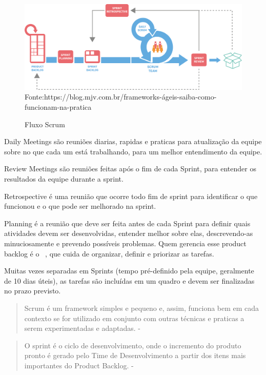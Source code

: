 \begin{figure}[H]
\centering
\caption{Fluxo Scrum} %
\includegraphics[scale=0.2]{Scrum}\\  %
{\small Fonte:https://blog.mjv.com.br/frameworks-ágeis-saiba-como-funcionam-na-pratica} %
\label{fig:scrum} %
\end{figure}

Daily Meetings são reuniões diarias, rapidas e praticas para atualização da equipe sobre no que cada um está trabalhando, para um melhor entendimento da equipe.

Review Meetings são reuniões feitas após o fim de cada Sprint, para entender os resultados da equipe durante a sprint.

Retrospective é uma reunião que ocorre todo fim de sprint para identificar o que funcionou e o que pode ser melhorado na sprint.

Planning é a reunião que deve ser feita antes de cada Sprint para definir quais atividades devem ser desenvolvidas, entender melhor sobre elas, descrevendo-as minuciosamente e prevendo possíveis problemas.
Quem gerencia esse product backlog é o  ~, que cuida de organizar, definir e priorizar as tarefas.

Muitas vezes separadas em Sprints (tempo pré-definido pela equipe, geralmente de 10 dias úteis), as tarefas são incluídas em um quadro e devem ser finalizadas no prazo previsto.

\begin{quote}
  Scrum é um framework simples e pequeno e, assim, funciona bem em  cada contexto se for utilizado em conjunto com outras técnicas e praticas a serem experimentadas e adaptadas. - \cite{sabbagh2014scrum}
\end{quote}
\begin{quote}
  O sprint é o ciclo de desenvolvimento, onde o incremento do produto pronto é gerado pelo Time de Desenvolvimento a partir dos itens mais importantes do Product Backlog. - \cite{sabbagh2014scrum}
\end{quote}


